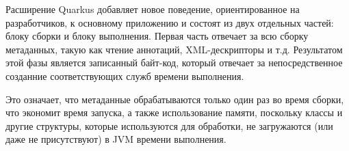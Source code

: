 \documentclass[russian,11pt]{article}
\begin{document}
Расширение Quarkus добавляет новое поведение, ориентированное на разработчиков, к основному приложению и состоят из двух отдельных частей: блоку сборки и блоку выполнения. Первая часть отвечает за всю сборку метаданных, такую как чтение аннотаций, XML-дескрипторы и т.д. Результатом этой фазы является записанный байт-код, который отвечает за непосредственное созданние соответствующих служб времени выполнения.

Это означает, что метаданные обрабатываются только один раз во время сборки, что экономит время запуска, а также использование памяти, поскольку классы и другие структуры, которые используются для обработки, не загружаются (или даже не присутствуют) в JVM времени выполнения.
\end{document}
